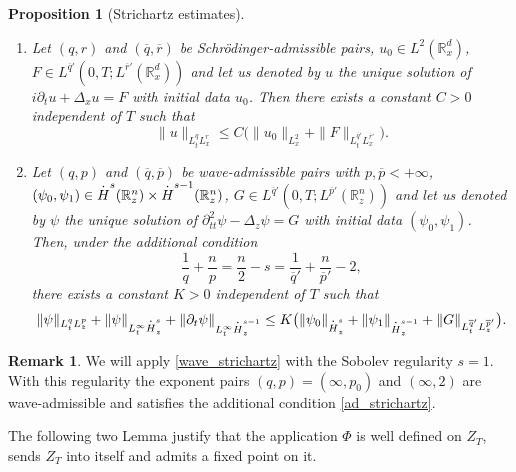 \documentclass[11pt]{article}
\newcommand{\skpt}{\smallskip}
\let\oldbar\bar\let\oldhat\hat\let\oldtilde\tilde
\newenvironment{enumeratei}
{\bgroup\def\theenumi{\roman{enumi}}\def\theenumii{\arabic{enumii}}\begin{enumerate}}
{\end{enumerate}\egroup}
\let\bar\oldbar
\let\hat\oldhat
\let\tilde\oldtilde
\DeclareRobustCommand{\accentset}[2]{\overset{#1}{#2}}
\newtheorem{proposition}[lemma]{Proposition}
\theoremstyle{definition}
\newtheorem{rmk}[lemma]{Remark}
\newcommand*{\overbigdot}[1]{%
\accentset{\mbox{\large\bfseries .}}{#1}}
\let\bar\overline
\let\hat\widehat
\let\tilde\widetilde
\newcommand{\R}{\mathbb{R}}
\begin{document}
\skpt
\begin{proposition}[Strichartz estimates]\label{strichartz}
\begin{enumeratei}
\item
Let $(q,r)$ and $(\bar{q},\bar{r})$ be Schrödinger-admissible pairs, $u_{0}\in L^{2}(\R_{x}^{d})$, $F\in L^{\bar{q}'}(0,T;L^{\bar{r}'}(\R_{x}^{d}))$ and let us denoted by $u$ the unique solution of $i\partial_{t}u+\Delta_{x}u=F$ with initial data $u_{0}$. Then there exists a constant $C>0$ independent of $T$ such that
\begin{equation}\label{schro_strichartz}
\|u\|_{L_{t}^{q}L_{x}^{r}}\leq C\bigl(\|u_{0}\|_{L_{x}^{2}}+\|F\|_{L_{t}^{\bar{q}'}L_{x}^{\bar{r}'}}\bigr).
\end{equation}

\item
Let $(q,p)$ and $(\bar{q},\bar{p})$ be wave-admissible pairs with $p,\bar{p}<+\infty$, $(\psi_{0},\psi_{1})\in\overbigdot{H}^{s}(\R_{z}^{n})\times\overbigdot{H}^{s-1}(\R_{z}^{n})$, $G\in L^{\bar{q}'}(0,T;L^{\bar{p}'}(\R_{z}^{n}))$ and let us denoted by $\psi$ the unique solution of $\partial_{tt}^{2}\psi-\Delta_{z}\psi=G$ with initial data $(\psi_{0},\psi_{1})$. Then, under the additional condition
\begin{equation}\label{ad_strichartz}
\frac{1}{q}+\frac{n}{p}=\frac{n}{2}-s=\frac{1}{\bar{q}'}+\frac{n}{\bar{p}'}-2,
\end{equation}
there exists a constant $K>0$ independent of $T$ such that
\begin{equation}\label{wave_strichartz}
\|\psi\|_{L_{t}^{q}L_{z}^{p}}+\|\psi\|_{L_{t}^{\infty}\overbigdot{H}_{z}^{s}}+\|\partial_{t}\psi\|_{L_{t}^{\infty}\overbigdot{H}_{z}^{s-1}}\leq K\bigl(\|\psi_{0}\|_{\overbigdot{H}_{z}^{s}}+\|\psi_{1}\|_{\overbigdot{H}_{z}^{s-1}}+\|G\|_{L_{t}^{\bar{q}'}L_{z}^{\bar{p}'}}\bigr).
\end{equation}
\end{enumeratei}
\end{proposition}

\begin{rmk}
We will apply \eqref{wave_strichartz} with the Sobolev regularity $s=1$. With this regularity the exponent pairs $(q,p)=(\infty,p_{0})$ and $(\infty,2)$ are wave-admissible and satisfies the additional condition \eqref{ad_strichartz}.
\end{rmk}

The following two Lemma justify that the application $\Phi$ is well defined on $Z_{T}$, sends $Z_{T}$ into itself and admits a fixed point on it.
\end{document}
